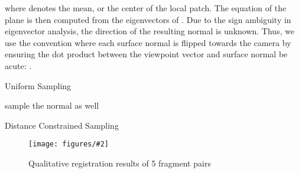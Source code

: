 \documentclass[10pt,twocolumn,letterpaper]{article}
\theoremstyle{break}
\newcommand{\insertimageStar}[5]{ \begin{figure*}[#5]
\centering
\texttt{[image: figures/\#2]}
\caption{#3}
\label{#4}
\vspace{-2mm}
\end{figure*}
}
\begin{document}
where  denotes the mean, or the center of the local patch. The equation of the plane is then computed from the eigenvectors of . Due to the sign ambiguity in eigenvector analysis, the direction of the resulting normal is unknown. Thus, we use the convention where each surface normal is flipped towards the camera by ensuring the dot product between the viewpoint vector and surface normal be acute: .
\setcounter{algorithm}{-1}
\begin{algorithm}[htbp]
	\footnotesize
	\caption{Uniform Sampling}
	\label{alg:sampling}
	\begin{algorithmic}
		\State {}
		\State 
		\State 
		\State 
		\For {}
		\State 
		\If {}
		\State 
		\State  \Comment sample the normal as well
		\EndIf
		\EndFor
		\caption{Distance Constrained Sampling}
	\end{algorithmic}
\end{algorithm}
\begin{figure*}[b!]
\label{fig:small_net}
\end{figure*}
\insertimageStar{0.9}{registration_result_cropped2.pdf}{Qualitative registration results of 5 fragment pairs}{fig:res_registration}{b!}
 
\end{document}
